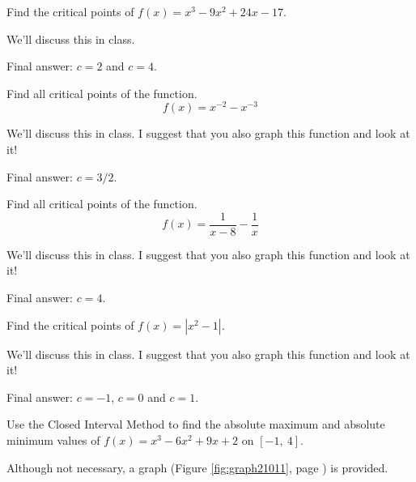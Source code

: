 \documentclass[12pt,addpoints, answers, fleqn]{exam}
\begin{document}
\begin{questions}
\question Find the critical points of $f \left( x \right) = x^3 - 9x^2 + 24 x -17$.
\begin{solution}
We'll discuss this in class.

Final answer: $c=2$ and $c=4$.
\end{solution}

\question Find all critical points of the function.
\[
f\left(x\right) = x^{-2} - x^{-3}
\]
\begin{solution}
We'll discuss this in class. I suggest that you also graph this function and look at it!

Final answer: $c=3/2$.
\end{solution}

\question Find all critical points of the function.
\[
f\left(x\right) = \frac{1}{x-8} - \frac{1}{x}
\]
\begin{solution}
We'll discuss this in class. I suggest that you also graph this function and look at it!

Final answer: $c=4$.
\end{solution}

\question Find the critical points of $f \left( x \right) = \left| x^2 - 1\right|$.
\begin{solution}
We'll discuss this in class. I suggest that you also graph this function and look at it!

Final answer: $c=-1$, $c=0$ and $c=1$.
\end{solution}




\question Use the Closed Interval Method to find the absolute maximum and absolute minimum values of $f \left( x \right) = x^3 - 6x^2 + 9x +2$ on $\left[ -1, \ 4 \right]$.
\begin{solution}
Although not necessary,  a graph (Figure \ref{fig:graph21011}, page \pageref{fig:graph21011}) is provided.



\end{solution}
\end{questions}
\end{document}
